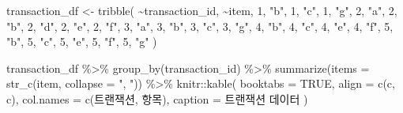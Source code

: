 \documentclass[
]{book}
\newenvironment{Shaded}{\begin{snugshade}}{\end{snugshade}}
\newcommand{\AttributeTok}[1]{\textcolor[rgb]{0.77,0.63,0.00}{#1}}
\newcommand{\ConstantTok}[1]{\textcolor[rgb]{0.00,0.00,0.00}{#1}}
\newcommand{\DecValTok}[1]{\textcolor[rgb]{0.00,0.00,0.81}{#1}}
\newcommand{\FunctionTok}[1]{\textcolor[rgb]{0.00,0.00,0.00}{#1}}
\newcommand{\NormalTok}[1]{#1}
\newcommand{\OtherTok}[1]{\textcolor[rgb]{0.56,0.35,0.01}{#1}}
\newcommand{\SpecialCharTok}[1]{\textcolor[rgb]{0.00,0.00,0.00}{#1}}
\newcommand{\StringTok}[1]{\textcolor[rgb]{0.31,0.60,0.02}{#1}}
\begin{document}
\begin{Shaded}
\begin{Highlighting}[]
\NormalTok{transaction\_df }\OtherTok{\textless{}{-}} \FunctionTok{tribble}\NormalTok{(}
  \SpecialCharTok{\textasciitilde{}}\NormalTok{transaction\_id, }\SpecialCharTok{\textasciitilde{}}\NormalTok{item,}
  \DecValTok{1}\NormalTok{, }\StringTok{"b"}\NormalTok{,}
  \DecValTok{1}\NormalTok{, }\StringTok{"c"}\NormalTok{,}
  \DecValTok{1}\NormalTok{, }\StringTok{"g"}\NormalTok{,}
  \DecValTok{2}\NormalTok{, }\StringTok{"a"}\NormalTok{,}
  \DecValTok{2}\NormalTok{, }\StringTok{"b"}\NormalTok{,}
  \DecValTok{2}\NormalTok{, }\StringTok{"d"}\NormalTok{,}
  \DecValTok{2}\NormalTok{, }\StringTok{"e"}\NormalTok{,}
  \DecValTok{2}\NormalTok{, }\StringTok{"f"}\NormalTok{,}
  \DecValTok{3}\NormalTok{, }\StringTok{"a"}\NormalTok{,}
  \DecValTok{3}\NormalTok{, }\StringTok{"b"}\NormalTok{,}
  \DecValTok{3}\NormalTok{, }\StringTok{"c"}\NormalTok{,}
  \DecValTok{3}\NormalTok{, }\StringTok{"g"}\NormalTok{,}
  \DecValTok{4}\NormalTok{, }\StringTok{"b"}\NormalTok{,}
  \DecValTok{4}\NormalTok{, }\StringTok{"c"}\NormalTok{,}
  \DecValTok{4}\NormalTok{, }\StringTok{"e"}\NormalTok{,}
  \DecValTok{4}\NormalTok{, }\StringTok{"f"}\NormalTok{,}
  \DecValTok{5}\NormalTok{, }\StringTok{"b"}\NormalTok{,}
  \DecValTok{5}\NormalTok{, }\StringTok{"c"}\NormalTok{,}
  \DecValTok{5}\NormalTok{, }\StringTok{"e"}\NormalTok{,}
  \DecValTok{5}\NormalTok{, }\StringTok{"f"}\NormalTok{,}
  \DecValTok{5}\NormalTok{, }\StringTok{"g"}
\NormalTok{)}

\NormalTok{transaction\_df }\SpecialCharTok{\%\textgreater{}\%}
  \FunctionTok{group\_by}\NormalTok{(transaction\_id) }\SpecialCharTok{\%\textgreater{}\%}
  \FunctionTok{summarize}\NormalTok{(}\AttributeTok{items =} \FunctionTok{str\_c}\NormalTok{(item, }\AttributeTok{collapse =} \StringTok{", "}\NormalTok{)) }\SpecialCharTok{\%\textgreater{}\%}
\NormalTok{  knitr}\SpecialCharTok{::}\FunctionTok{kable}\NormalTok{(}
    \AttributeTok{booktabs =} \ConstantTok{TRUE}\NormalTok{,}
    \AttributeTok{align =} \FunctionTok{c}\NormalTok{(}\StringTok{\textquotesingle{}c\textquotesingle{}}\NormalTok{, }\StringTok{\textquotesingle{}c\textquotesingle{}}\NormalTok{),}
    \AttributeTok{col.names =} \FunctionTok{c}\NormalTok{(}\StringTok{\textquotesingle{}트랜잭션\textquotesingle{}}\NormalTok{, }\StringTok{\textquotesingle{}항목\textquotesingle{}}\NormalTok{),}
    \AttributeTok{caption =} \StringTok{\textquotesingle{}트랜잭션 데이터\textquotesingle{}}
\NormalTok{  )}
\end{Highlighting}
\end{Shaded}
\end{document}
